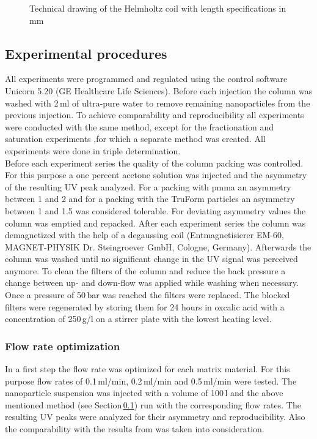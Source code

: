 \begin{figure}[H]
        \caption[Technical drawing of the Helmholtz coil]{Technical drawing of the Helmholtz coil with length specifications in mm }
        \label{fig:Helmholtz_coil}
  \end{figure}  

\subsection{Experimental procedures}
\label{subsec:Exp_Pro}
All experiments were programmed and regulated using the control software Unicorn 5.20 (GE Healthcare Life Sciences). Before each injection the column was washed with 2\,ml of ultra-pure water to remove remaining nanoparticles from the previous injection. To achieve comparability and reproducibility all experiments were conducted with the same method, except for the fractionation and saturation experiments ,for which a separate method was created. All experiments were done in triple determination. \\
Before each experiment series the quality of the column packing was controlled. For this purpose a one percent acetone solution was injected and the asymmetry of the  resulting UV peak analyzed. For a packing with \gls{pmma} an asymmetry between 1 and 2 and for a packing with the TruForm particles an asymmetry between 1 and 1.5 was considered tolerable. For deviating asymmetry values the column was emptied and repacked. After each experiment series the column was demagnetized with the help of a degaussing coil (Entmagnetisierer EM-60, MAGNET-PHYSIK Dr. Steingroever GmbH, Cologne, Germany). Afterwards the column was washed until no significant change in the UV signal was perceived anymore. To clean the filters of the column and reduce the back pressure a change between up- and down-flow was applied while washing when necessary. Once a pressure of 50\,bar was reached the filters were replaced. The blocked filters were regenerated by storing them for 24 hours in oxcalic acid with a concentration of 250\,g/l on a stirrer plate with the lowest heating level.

\subsubsection{Flow rate optimization}
\label{subsubsec:Flow_rate}
In a first step the flow rate was optimized for each matrix material. For this purpose flow rates of 0.1\,ml/min, 0.2\,ml/min and 0.5\,ml/min were tested. The nanoparticle suspension was injected with a volume of 100\,\textmu l and the above mentioned method (see Section\,\ref{subsec:Exp_Pro}) run with the corresponding flow rates. The resulting UV peaks were analyzed for their asymmetry and reproducibility. Also the comparability with the results from \cite{AndreMaster} was taken into consideration.  


